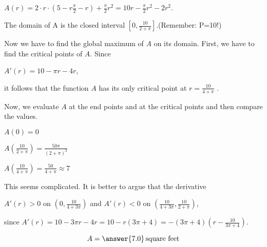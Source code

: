 \documentclass{ximera}
\begin{document}
\begin{exercise}
\begin{hint}
           $A(r)=2\cdot r\cdot (5-r\frac{\pi}{2}-r)+\frac{\pi}{2} r^2=10r-\frac{\pi}{2}r^2-2r^2$.
           
           The domain of A is  the closed interval $\left[0,\frac{10}{2+\pi}\right]$.(Remember: P=10!)
              \end{hint}
                \begin{hint}
                Now we have to find the global maximum of $A$ on its domain.
                First, we have to find the critical points of $A$.
                Since
                
                $A'(r)=10-\pi r-4r$,
                
                it follows that the function $A$ has its only critical point at  $r=\frac{10}{4+\pi}$ .
                              \end{hint}
                                \begin{hint}
                                Now, we evaluate $A$ at the end points and at the critical points and then compare the values.
                                
                                $A(0)=0$
                                
                                $A\left(\frac{10}{2+\pi}\right)=\frac{50\pi}{(2+\pi)^2}$
                                
                                $A\left(\frac{10}{4+\pi}\right)=\frac{50}{4+\pi}\approx 7$
                                
                                This seems complicated. It is better to argue that the derivative 
                                
                                $A'(r)>0$ on $\left(0,\frac{10}{4+3\pi}\right)$ and  $A'(r)<0$ on $\left(\frac{10}{4+3\pi},\frac{10}{2+\pi}\right)$,
                                
                                 since $A'(r)=10-3\pi r-4r=10-r(3\pi+4)=-(3\pi+4)\left(r-\frac{10}{3\pi+4}\right)$.

                                  \end{hint}
  \begin{prompt}
  \[
  A = \answer{7.0}\,\text{square feet}
  \]
  \end{prompt}
\end{exercise}
\end{document}
